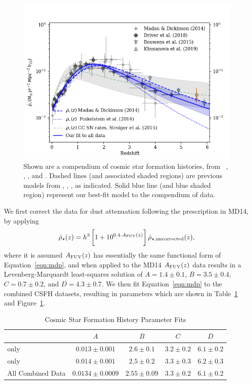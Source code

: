\documentclass[apj]{aastex62}
\begin{document}
\begin{figure}[t]
   \centering
   \includegraphics[width=6.1in]{figure_csfh_today}
   \caption{\footnotesize Shown are a compendium of cosmic star formation histories, from ~\cite{Madau:2014fk}, \cite{Driver:2018nr}, \cite{Bouwens:2015qy}, and \cite{Khusanova:2019kx}. Dashed lines (and associated shaded regions) are previous models  from \cite{Madau:2014fk}, \cite{Finkelstein:2014fj}, \cite{Strolger:2015aa}, as indicated. Solid blue line (and blue shaded region) represent our best-fit model to the compendium of data.}
   \label{fig:csfhs}
\end{figure}

We first correct the \cite{Driver:2018nr} data for dust attenuation following the prescription in MD14, by applying 
\begin{equation}
	\dot{\rho}_{\star}(z) =h^3\,\biggl[1+10^{0.4\cdot A_{\rm FUV}(z)}\biggr]\, \dot{\rho}_{\star, {\rm uncorrected}}(z),
\end{equation}
where it is assumed $A_{\rm FUV}(z)$ has essentially the same functional form of Equation~\ref{eqn:mdp}, and when applied to the MD14 $A_{\rm FUV}(z)$ data results in a Levenberg-Marquardt least-squares solution of $A=1.4\pm0.1$, $B=3.5\pm0.4$, $C=0.7\pm0.2$, and $D=4.3\pm0.7$. We then fit Equation~\ref{eqn:mdp} to the combined CSFH datasets,    resulting in parameters which are shown in Table~\ref{tab:csfh_fits} and Figure~\ref{fig:csfhs}. 

\begin{table}[h]
    \centering
    \caption{Cosmic Star Formation History Parameter Fits}
    \label{tab:csfh_fits}
    \begin{tabular}{lcccc}
         & $A$ & $B$ & $C$ & $D$ \\
        \hline
        \hline
	\cite{Madau:2014fk} only & $0.013 \pm 0.001$ & $2.6 \pm 0.1$ & $3.2 \pm 0.2$ & $6.1 \pm 0.2$\\
	\cite{Driver:2018nr} only & $0.014 \pm 0.001$ & $2.5 \pm 0.2$ & $3.3 \pm 0.3$ & $6.2 \pm 0.3$\\
	\hline
	All Combined Data & $0.0134 \pm 0.0009$ & $2.55 \pm 0.09$ & $3.3 \pm 0.2$ & $6.1 \pm 0.2$\\
	\hline
    \end{tabular}
\end{table}
\end{document}
